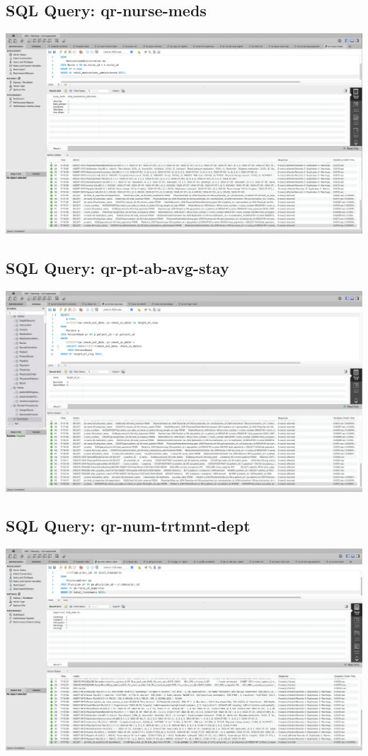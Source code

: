 \documentclass[a4paper,11pt]{article}
\theoremstyle{mytheor}
\begin{document}
\subsection{SQL Query: qr-nurse-meds}
\includegraphics[width=\textwidth]{Screenshots/SCR-20240727-peuz.png}

\subsection{SQL Query: qr-pt-ab-avg-stay}
\includegraphics[width=\textwidth]{Screenshots/SCR-20240727-phcc.png}

\subsection{SQL Query: qr-num-trtmnt-dept}
\includegraphics[width=\textwidth]{Screenshots/SCR-20240727-pegx.png}
\end{document}
